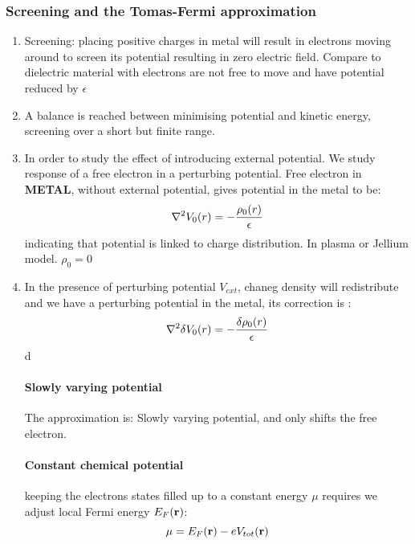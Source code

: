 \documentclass[12pt,a4paper]{article}
\begin{document}
        \subsubsection{Screening and the Tomas-Fermi approximation}
            \begin{enumerate}
                \item Screening: placing positive charges in metal will result in electrons moving around to screen its potential resulting in zero electric field. Compare to dielectric material with electrons are not free to move and have potential reduced by $\epsilon$
                \item A balance is reached between minimising potential and kinetic energy, screening over a short but finite range.
                \item In order to study the effect of introducing external potential. We study response of a free electron in a perturbing potential. Free electron in \textbf{METAL}, without external potential, gives potential in the metal to be:
                \begin{equation}
                    \laplacian {V_0}(r) = - \frac{\rho_0(r)}{\epsilon}
                \end{equation}
                indicating that potential is linked to charge distribution. In plasma or Jellium model. $\rho_0 =0$
                \item In the presence of perturbing potential $V_{ext}$, chaneg density will redistribute and we have a perturbing potential in the metal, its correction is :
                \begin{equation}
                    \laplacian \delta{V_0}(r) = - \frac{\delta \rho_0(r)}{\epsilon}
                \end{equation}d
                \paragraph*{Slowly varying potential} 
                The approximation is: Slowly varying potential, and only shifts the free electron.
                \paragraph*{Constant chemical potential}
                keeping the electrons states filled up to a constant energy $\mu$ requires we adjust local Fermi energy $E_F(\vb{r})$:
                \begin{equation}
                    \mu = E_F(\vb{r}) - e V_{tot}(\vb{r})
                \end{equation}

\end{enumerate}
\end{document}
